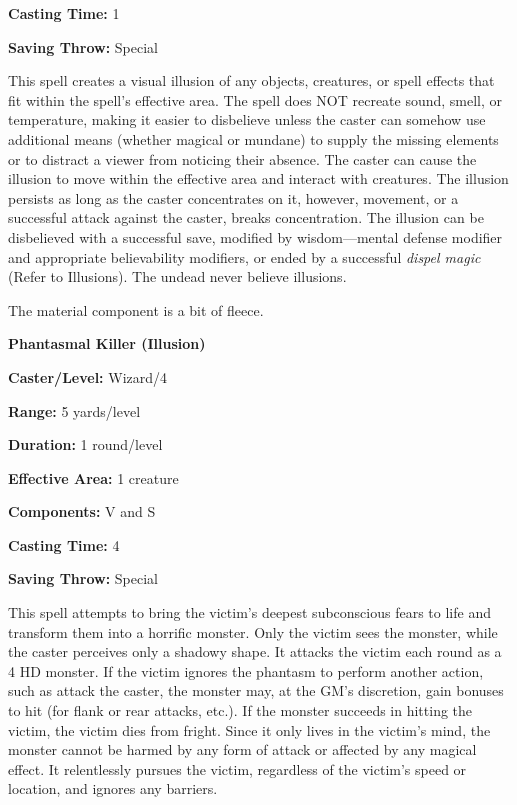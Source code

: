 \begin{multicols}{2}
\begin{minipage}{\columnwidth}
\noindent \textbf{Casting Time:} 1

\noindent \textbf{Saving Throw:} Special

\end{minipage}

This spell creates a visual illusion of any objects, creatures, or spell effects that fit within the spell's effective area.  The spell does NOT recreate sound, smell, or temperature, making it easier to disbelieve unless the caster can somehow use additional means (whether magical or mundane) to supply the missing elements or to distract a viewer from noticing their absence.  The caster can cause the illusion to move within the effective area and interact with creatures.  The illusion persists as long as the caster concentrates on it, however, movement, or a successful attack against the caster, breaks concentration.  The illusion can be disbelieved with a successful save, modified by wisdom---mental defense modifier and appropriate believability modifiers, or ended by a successful \textit{dispel magic} (Refer to Illusions).  The undead never believe illusions.

The material component is a bit of fleece.

\vspace{1em}

\noindent
\begin{minipage}{\columnwidth}

\noindent \textbf{Phantasmal Killer (Illusion)}

\noindent \textbf{Caster/Level:} Wizard/4

\noindent \textbf{Range:} 5 yards/level

\noindent \textbf{Duration:} 1 round/level

\noindent \textbf{Effective Area:} 1 creature

\noindent \textbf{Components:} V and S

\noindent \textbf{Casting Time:} 4

\noindent \textbf{Saving Throw:} Special

\end{minipage}

This spell attempts to bring the victim's deepest subconscious fears to life and transform them into a horrific monster.  Only the victim sees the monster, while the caster perceives only a shadowy shape.  It attacks the victim each round as a 4 HD monster.  If the victim ignores the phantasm to perform another action, such as attack the caster, the monster may, at the GM's discretion, gain bonuses to hit (for flank or rear attacks, etc.).  If the monster succeeds in hitting the victim, the victim dies from fright.  Since it only lives in the victim's mind, the monster cannot be harmed by any form of attack or affected by any magical effect.  It relentlessly pursues the victim, regardless of the victim's speed or location, and ignores any barriers.


\end{multicols}
